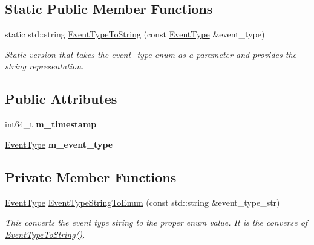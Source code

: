 \subsection*{Static Public Member Functions}
\begin{DoxyCompactItemize}
\item 
static std\+::string \mbox{\hyperlink{classEventMessage_ac6ffbdd947ed15375d4882003626b33e}{Event\+Type\+To\+String}} (const \mbox{\hyperlink{classEventMessage_a262da559aa416f176fdda72e8b5113ab}{Event\+Type}} \&event\+\_\+type)
\begin{DoxyCompactList}\small\item\em Static version that takes the event\+\_\+type enum as a parameter and provides the string representation. \end{DoxyCompactList}\end{DoxyCompactItemize}
\subsection*{Public Attributes}
\begin{DoxyCompactItemize}
\item 
\mbox{\label{classEventMessage_a4f06f4fe7d1942cf726290b448388c41}} 
int64\+\_\+t {\bfseries m\+\_\+timestamp}
\item 
\mbox{\label{classEventMessage_a21de23824810f136bc833c5d62b064dd}} 
\mbox{\hyperlink{classEventMessage_a262da559aa416f176fdda72e8b5113ab}{Event\+Type}} {\bfseries m\+\_\+event\+\_\+type}
\end{DoxyCompactItemize}
\subsection*{Private Member Functions}
\begin{DoxyCompactItemize}
\item 
\mbox{\hyperlink{classEventMessage_a262da559aa416f176fdda72e8b5113ab}{Event\+Type}} \mbox{\hyperlink{classEventMessage_aa4656857adf12d74bd0ba9c04e2ee539}{Event\+Type\+String\+To\+Enum}} (const std\+::string \&event\+\_\+type\+\_\+str)
\begin{DoxyCompactList}\small\item\em This converts the event type string to the proper enum value. It is the converse of \mbox{\hyperlink{classEventMessage_a3dd4a7325fcc39e7cfdf2365422ae1c7}{Event\+Type\+To\+String()}}. \end{DoxyCompactList}\end{DoxyCompactItemize}


